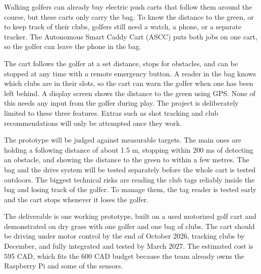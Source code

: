 
Walking golfers can already buy electric push carts that follow them around the course, but these carts only carry the bag. To know the distance to the green, or to keep track of their clubs, golfers still need a watch, a phone, or a separate tracker. The Autonomous Smart Caddy Cart (ASCC) puts both jobs on one cart, so the golfer can leave the phone in the bag.

The cart follows the golfer at a set distance, stops for obstacles, and can be stopped at any time with a remote emergency button. A reader in the bag knows which clubs are in their slots, so the cart can warn the golfer when one has been left behind. A display screen shows the distance to the green using GPS. None of this needs any input from the golfer during play. The project is deliberately limited to these three features. Extras such as shot tracking and club recommendations will only be attempted once they work.

The prototype will be judged against measurable targets. The main ones are holding a following distance of about 1.5 m, stopping within 200 ms of detecting an obstacle, and showing the distance to the green to within a few metres. The bag and the drive system will be tested separately before the whole cart is tested outdoors. The biggest technical risks are reading the club tags reliably inside the bag and losing track of the golfer. To manage them, the tag reader is tested early and the cart stops whenever it loses the golfer.

The deliverable is one working prototype, built on a used motorized golf cart and demonstrated on dry grass with one golfer and one bag of clubs. The cart should be driving under motor control by the end of October 2026, tracking clubs by December, and fully integrated and tested by March 2027. The estimated cost is 595 CAD, which fits the 600 CAD budget because the team already owns the Raspberry Pi and some of the sensors.
\clearpage

